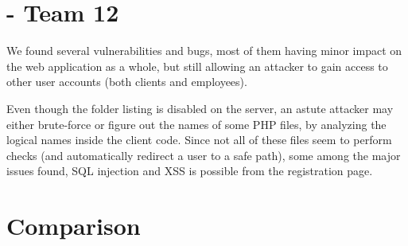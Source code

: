 \section{\gnb - Team 12}
We found several vulnerabilities and bugs, most of them having minor impact on the web application as a whole, but still allowing an attacker to gain access to other user accounts (both clients and employees). \newline

Even though the folder listing is disabled on the server, an astute attacker may either brute-force or figure out the names of some PHP files, by analyzing the logical names inside the client code. Since not all of these files seem to perform checks (and automatically redirect a user to a safe path), some among the major issues found, SQL injection and XSS is possible from the registration page.

\section{Comparison}

